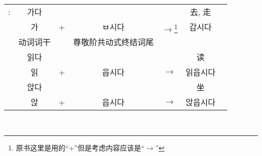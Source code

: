 \begin{grammar}
\begin{grammarsect}[\kr -(으){}ㅂ시다]
\begin{itemize}
        \end{itemize}
        \begin{tabular}{ccccccc}
            \kr \ruby{例}{예}:&\kr 가다&&&&去, 走\\
            &\kr 가&+&\kr ㅂ시다&$\to$\footnote{原书这里是用的``+''但是考虑内容应该是``$\to$''}&\kr 갑시다\\\cline{2-2}\cline{4-4}
            &动词词干&&尊敬阶共动式终结词尾\\
            &\kr 읽다 &&&&读\\
            &\kr 읽 &+&\kr 읍시다&$\to$&\kr  읽읍시다\\
            &\kr 앉다 &&&&坐\\
            &\kr 앉 &+&\kr 읍시다&$\to$&\kr 앉읍시다
        \end{tabular}\\
    \end{grammarsect}
\end{grammar}

